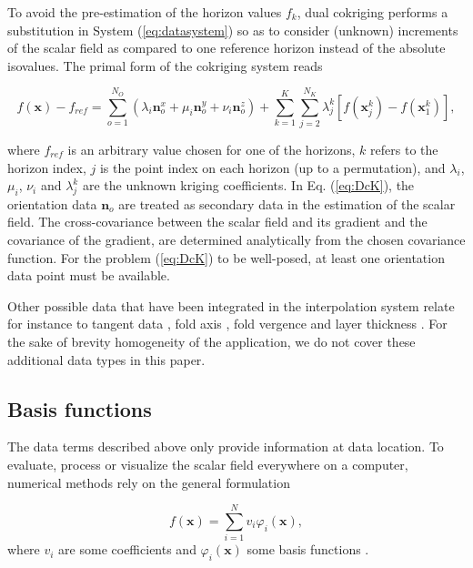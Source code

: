 \documentclass[final]{ring20}
\newcommand{\bx}{\mathbf{x}}
\newcommand{\bn}{\mathbf{n}}
\begin{document}
To avoid the pre-estimation of the horizon values $f_k$, dual cokriging \citep[DcK, ][]{Lajaunie1997MG,Chiles04OMSMP} performs a substitution in System (\ref{eq:datasystem}) so as to consider (unknown) increments of the scalar field as compared to one reference horizon instead of the absolute isovalues. The primal form of the cokriging system reads

\begin{equation}
\label{eq:DcK}
f(\bx) - f_{ref} = \sum_{o=1}^{N_O} (\lambda_i \bn_o^x + \mu_i \bn_o^y + \nu_i \bn_o^z) + \sum_{k=1}^{K} \sum_{j=2}^{N_K} \lambda_{j}^{k}[f(\bx_j^k) - f(\bx_1^k)], 
\end{equation}

where $f_{ref}$ is an arbitrary value chosen for one of the horizons, $k$ refers to the horizon index, $j$ is the point index on each horizon (up to a permutation), and $\lambda_i$, $\mu_i$, $\nu_i$ and $\lambda_j^k$ are the unknown kriging coefficients. In Eq. (\ref{eq:DcK}), the orientation data $\bn_o$ are treated as secondary data in the estimation of the scalar field. The cross-covariance between the scalar field and its gradient and the covariance of the gradient, are determined analytically from the chosen covariance function. For the problem (\ref{eq:DcK}) to be well-posed, at least one orientation data point must be available. 

Other possible data that have been integrated in the interpolation system relate for instance to tangent data \citep{Lajaunie1997MG, Caumon2013GaRSITo, Hillier2014MG}, fold axis \citep{MassiotGM2010,Hillier2014MG}, fold vergence \citep{Laurent2016EaPSL,Grose2017JSG} and layer thickness \citep{Laurent2016MG}. For the sake of brevity homogeneity of the application, we do not cover these additional data types in this paper. 

\subsection{Basis functions} 

The data terms described above only provide information at data location. To evaluate, process or visualize the scalar field everywhere on a computer, numerical methods rely on the general formulation 

\begin{equation}
\label{eq:basis}
  f(\mathbf{x}) = \sum_{i=1}^{N}{v_i\varphi_i(\mathbf{x})},
\end{equation}
\noindent where $v_i$ are some coefficients and $\varphi_i(\mathbf{x})$ some basis functions \citep[e.g., ][]{Hillier2014MG,Renaudeau2019MG,Wellmann2018AiG}.
 
\end{document}

